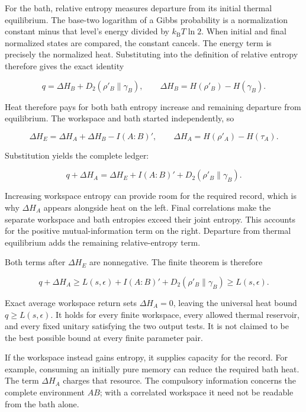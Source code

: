 \documentclass[11pt,letterpaper]{article}
\begin{document}
For the bath, relative entropy measures departure from its initial thermal equilibrium. The base-two logarithm of a Gibbs probability is a normalization constant minus that level's energy divided by \(k_{\mathrm{B}}T\ln 2\). When initial and final normalized states are compared, the constant cancels. The energy term is precisely the normalized heat. Substituting into the definition of relative entropy therefore gives the exact identity

\[q = \Delta H_{B} + D_{2}\left( \rho\prime_{B}\|\gamma_{B} \right),\quad\quad\Delta H_{B} = H\left( \rho\prime_{B} \right) - H\left( \gamma_{B} \right).\]

Heat therefore pays for both bath entropy increase and remaining departure from equilibrium. The workspace and bath started independently, so

\[\Delta H_{E} = \Delta H_{A} + \Delta H_{B} - I(A{:}B)',\quad\quad\Delta H_{A} = H\left( \rho\prime_{A} \right) - H\left( \tau_{A} \right).\]

Substitution yields the complete ledger:

\[q + \Delta H_{A} = \Delta H_{E} + I(A{:}B)' + D_{2}\left( \rho\prime_{B}\|\gamma_{B} \right).\]

Increasing workspace entropy can provide room for the required record, which is why \(\Delta H_{A}\) appears alongside heat on the left. Final correlations make the separate workspace and bath entropies exceed their joint entropy. This accounts for the positive mutual-information term on the right. Departure from thermal equilibrium adds the remaining relative-entropy term.

Both terms after \(\Delta H_{E}\) are nonnegative. The finite theorem is therefore

\[q + \Delta H_{A} \geq L(s,\epsilon) + I(A{:}B)' + D_{2}\left( \rho\prime_{B}\|\gamma_{B} \right) \geq L(s,\epsilon).\]

Exact average workspace return sets \(\Delta H_{A} = 0\), leaving the universal heat bound \(q \geq L(s,\epsilon)\). It holds for every finite workspace, every allowed thermal reservoir, and every fixed unitary satisfying the two output tests. It is not claimed to be the best possible bound at every finite parameter pair.

If the workspace instead gains entropy, it supplies capacity for the record. For example, consuming an initially pure memory can reduce the required bath heat. The term \(\Delta H_{A}\) charges that resource. The compulsory information concerns the complete environment \(AB\); with a correlated workspace it need not be readable from the bath alone.
\end{document}
